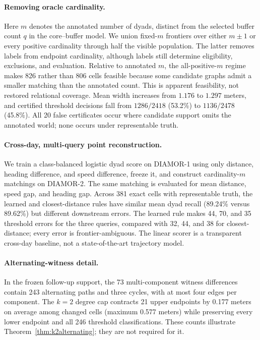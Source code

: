 \paragraph{Removing oracle cardinality.}
Here $m$ denotes the annotated number of dyads, distinct from the selected
buffer count $q$ in the core--buffer model. We union fixed-$m$ frontiers over
either $m\pm1$ or every positive cardinality
through half the visible population. The latter removes labels from endpoint
cardinality, although labels still determine eligibility, exclusions, and
evaluation. Relative to annotated $m$, the all-positive-$m$ regime makes 826
rather than 806 cells feasible because some candidate graphs admit a smaller
matching than the annotated count. This is apparent feasibility, not restored
relational coverage. Mean width increases from $1.176$ to $1.297$ meters, and
certified threshold decisions fall from $1286/2418$ (53.2\%) to $1136/2478$
(45.8\%). All 20 false certificates occur where candidate support omits the
annotated world; none occurs under representable truth.

\paragraph{Cross-day, multi-query point reconstruction.}
We train a class-balanced logistic dyad score on DIAMOR-1 using only distance,
heading difference, and speed difference, freeze it, and construct
cardinality-$m$ matchings on DIAMOR-2. The same matching is evaluated for mean
distance, speed gap, and heading gap. Across 381 exact cells with representable
truth, the learned and closest-distance rules have similar mean dyad recall
(89.24\% versus 89.62\%) but different downstream errors. The learned rule
makes 44, 70, and 35 threshold errors for the three queries, compared with 32,
44, and 38 for closest-distance; every error is frontier-ambiguous. The linear
scorer is a transparent cross-day baseline, not a state-of-the-art trajectory
model.

\paragraph{Alternating-witness detail.}
In the frozen follow-up support, the 73 multi-component witness differences
contain 243 alternating paths and three cycles, with at most four edges per
component. The $k=2$ degree cap contracts 21 upper endpoints by 0.177 meters on
average among changed cells (maximum 0.577 meters) while preserving every lower
endpoint and all 246 threshold classifications. These counts illustrate
Theorem~\ref{thm:k2alternating}; they are not required for it.

